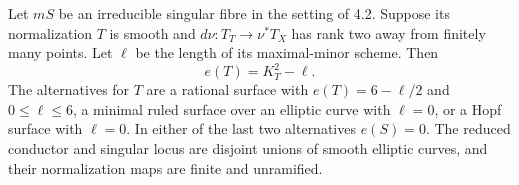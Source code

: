 \begin{proposition}[P4.15]\hypertarget{tag-02WM}{}\label{night:P4.15}\label{stmt:P4.15}

Let $mS$ be an irreducible singular fibre in the setting of 4.2.
Suppose its normalization $T$ is smooth and $d\nu:T_T\to\nu^*T_X$
has rank two away from finitely many points. Let $\ell$ be the
length of its maximal-minor scheme. Then
\[
 e(T)=K_T^2-\ell.
\]
The alternatives for $T$ are a rational surface with
$e(T)=6-\ell/2$ and $0\leq\ell\leq6$, a minimal ruled surface
over an elliptic curve with $\ell=0$, or a Hopf surface with
$\ell=0$. In either of the last two alternatives $e(S)=0$.
The reduced conductor and singular locus are disjoint unions of
smooth elliptic curves, and their normalization maps are finite
and unramified.
\end{proposition}
